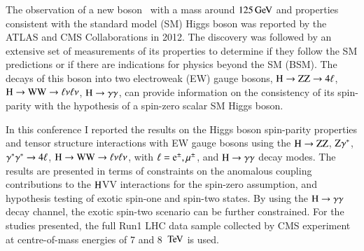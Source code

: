 The observation of a new boson~\cite{Aad:2012tfa,Chatrchyan:2012ufa}
with a mass around $125\,\mathrm{Ge\hspace{-.08em}V}$ and properties consistent with the
standard model (SM) Higgs boson was reported by the ATLAS and CMS
Collaborations in 2012. The discovery was followed by an extensive set
of measurements of its properties to determine if they follow the SM
predictions or if there are indications for physics beyond the SM
(BSM). The decays of this boson into two electroweak (EW) gauge
bosons, $\mathrm{H}\to\mathrm{Z}\mathrm{Z}\to4\ell$, $\mathrm{H}\to\mathrm{W}\mathrm{W}\to\ell\nu\ell\nu$, $\mathrm{H}\to\gamma\gamma$, can provide information on
the consistency of its spin-parity with the hypothesis of a spin-zero
scalar SM Higgs boson.

In this conference I reported the results on the Higgs boson
spin-parity properties and tensor structure interactions with EW gauge
bosons using the $\mathrm{H}\to\mathrm{Z}\mathrm{Z}$, $\mathrm{Z}\gamma^*$, $\gamma^*\gamma^*\to4\ell$,
$\mathrm{H}\to\mathrm{W}\mathrm{W}\to\ell\nu\ell\nu$, with $\ell=\mathrm{\mathrm{e}}^{\pm},\mu^{\pm}$, and $\mathrm{H}\to\gamma\gamma$ decay modes. The
results are presented in terms of constraints on the anomalous
coupling contributions to the $\mathrm{H}$VV interactions for the spin-zero
assumption, and hypothesis testing of exotic spin-one and spin-two
states.  By using the $\mathrm{H}\to\gamma\gamma$ decay channel, the exotic spin-two
scenario can be further constrained.  For the studies presented, the
full Run1 LHC data sample collected by CMS experiment~\cite{Chatrchyan:2008zzk}
at centre-of-mass energies of 7 and 8 $\,\mathrm{Te\hspace{-.08em}V}$ is used.


